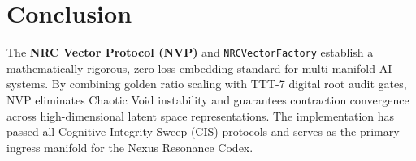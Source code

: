 \section{Conclusion}
The \textbf{NRC Vector Protocol (NVP)} and \texttt{NRCVectorFactory} establish a mathematically rigorous, zero-loss embedding standard for multi-manifold AI systems. By combining golden ratio scaling with TTT-7 digital root audit gates, NVP eliminates Chaotic Void instability and guarantees contraction convergence across high-dimensional latent space representations. The implementation has passed all Cognitive Integrity Sweep (CIS) protocols and serves as the primary ingress manifold for the Nexus Resonance Codex.
